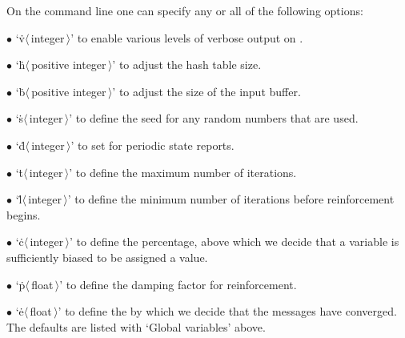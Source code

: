 On the command line one can specify any or all of the following options:
\smallskip
\item{$\bullet$}
`\.v$\langle\,$integer$\,\rangle$' to enable various levels of verbose
output on .
\item{$\bullet$}
`\.h$\langle\,$positive integer$\,\rangle$' to adjust the hash table size.
\item{$\bullet$}
`\.b$\langle\,$positive integer$\,\rangle$' to adjust the size of the input
buffer.
\item{$\bullet$}
`\.s$\langle\,$integer$\,\rangle$' to define the seed for any random numbers
that are used.
\item{$\bullet$}
`\.d$\langle\,$integer$\,\rangle$' to set  for periodic state
reports.
\item{$\bullet$}
`\.t$\langle\,$integer$\,\rangle$' to define the maximum number of iterations.
\item{$\bullet$}
`\.l$\langle\,$integer$\,\rangle$' to define the minimum number of iterations
before reinforcement begins.
\item{$\bullet$}
`\.c$\langle\,$integer$\,\rangle$' to define the 
percentage,
above which we decide that a variable is sufficiently biased to be assigned
a value.
\item{$\bullet$}
`\.p$\langle\,$float$\,\rangle$' to define the damping factor 
for reinforcement.
\item{$\bullet$}
`\.e$\langle\,$float$\,\rangle$' to define the 
by which we decide that the messages have converged.
\smallskip\noindent
The defaults are listed with `Global variables' above.

